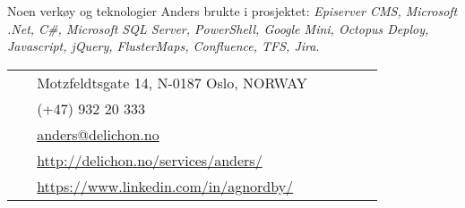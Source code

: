 \documentclass[10pt]{article} %
\begin{document}
\begin{paracol}{2}
{\qquad Noen verkøy og teknologier Anders brukte i prosjektet: \textit{Episerver CMS, Microsoft .Net, C\#, Microsoft SQL Server, PowerShell, Google Mini, Octopus Deploy, Javascript, jQuery, FlusterMaps, Confluence, TFS, Jira}.} 





\vspace{-\baselineskip}\medskip %

\switchcolumn %


\parbox[top][0.12\textheight][c]{\linewidth}{ %
	\vspace{-0.04\textheight} %
	\colorbox{shade}{ %
		\begin{supertabular}{p{0.05\linewidth}|p{0.775\linewidth}} %
			\raisebox{-1pt}{\faHome} & Motzfeldtsgate 14, N-0187 Oslo, NORWAY \\ %
			\raisebox{-1pt}{\faPhone} & (+47) 932 20 333 \\ %
			\raisebox{0pt}{\small\faEnvelope} & \href{mailto:anders@delichon.no}{anders@delichon.no} \\ %
			\raisebox{-1pt}{\small\faDesktop} & \href{http://delichon.no/services/anders/}{http://delichon.no/services/anders/} \\ %
			\raisebox{-1pt}{\faLinkedinSquare} & \href{https://www.linkedin.com/in/agnordby/}{https://www.linkedin.com/in/agnordby/} \\ %
		\end{supertabular}
	}
}


\end{paracol}
\end{document}
